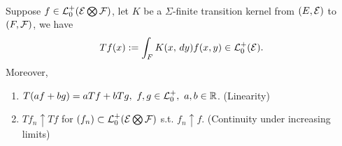 \vspace{6pt}
\begin{proposition}\ \\
Suppose $f \in \mathcal{L}_0^+(\mathcal{E} \bigotimes \mathcal{F})$, let $K$ be a $\Sigma$-finite transition kernel from $(E,\mathcal{E})$ to $(F,\mathcal{F})$, we have
\begin{equation*}
    Tf(x) := \int_F K(x,\,dy) f(x,y) \in \mathcal{L}_0^+(\mathcal{E}).
\end{equation*}
Moreover,
\begin{enumerate}[label = (\alph*)]
    \item $T(af + bg) = a Tf + b Tg,\ f,g \in \mathcal{L}_0^+,\ a,b \in \mathbb{R}$. (Linearity)
    \item $Tf_n \uparrow Tf$ for $(f_n) \subset \mathcal{L}_0^+(\mathcal{E} \bigotimes \mathcal{F})$ s.t. $f_n \uparrow f$. (Continuity under increasing limits)
    \end{enumerate}
\end{proposition}
